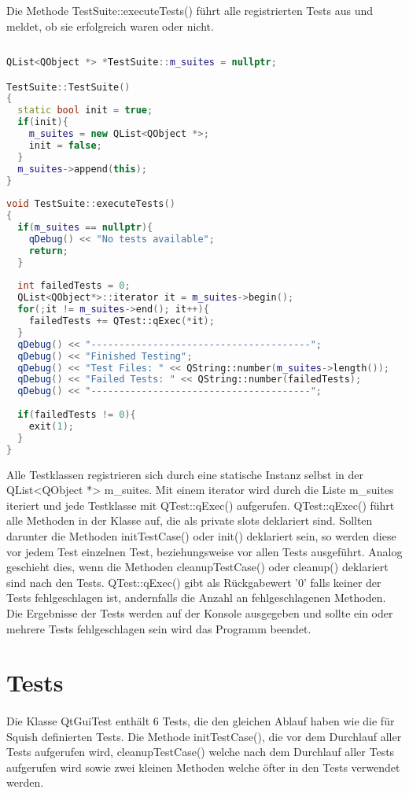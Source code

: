 		Die Methode TestSuite::executeTests() führt alle registrierten Tests aus und meldet, ob sie erfolgreich waren oder nicht.
		\begin{lstlisting}[language=C++, caption=testsuite.cpp]
			
QList<QObject *> *TestSuite::m_suites = nullptr;

TestSuite::TestSuite()
{
  static bool init = true;
  if(init){
    m_suites = new QList<QObject *>;
    init = false;
  }
  m_suites->append(this);
}
		
void TestSuite::executeTests()
{
  if(m_suites == nullptr){
    qDebug() << "No tests available";
    return;
  }
	
  int failedTests = 0;
  QList<QObject*>::iterator it = m_suites->begin();
  for(;it != m_suites->end(); it++){
  	failedTests += QTest::qExec(*it);
  }
  qDebug() << "---------------------------------------";
  qDebug() << "Finished Testing";
  qDebug() << "Test Files: " << QString::number(m_suites->length());
  qDebug() << "Failed Tests: " << QString::number(failedTests);
  qDebug() << "---------------------------------------";
	
  if(failedTests != 0){
    exit(1);
  }
}
\end{lstlisting}
		Alle Testklassen registrieren sich durch eine statische Instanz selbst in der QList<QObject *> m\_suites. Mit einem iterator wird durch die Liste m\_suites iteriert und jede Testklasse mit QTest::qExec() aufgerufen. QTest::qExec() führt alle Methoden in der Klasse auf, die als private slots deklariert sind. Sollten darunter die Methoden initTestCase() oder init() deklariert sein, so werden diese vor jedem Test einzelnen Test, beziehungsweise vor allen Tests ausgeführt. Analog geschieht dies, wenn die Methoden cleanupTestCase() oder cleanup() deklariert sind nach den Tests. QTest::qExec() gibt als Rückgabewert '0' falls keiner der Tests fehlgeschlagen ist, andernfalls die Anzahl an fehlgeschlagenen Methoden. Die Ergebnisse der Tests werden auf der Konsole ausgegeben und sollte ein oder mehrere Tests fehlgeschlagen sein wird das Programm beendet.
		
		\newpage
		
		\section{Tests}
		\paragraph{} Die Klasse QtGuiTest enthält 6 Tests, die den gleichen Ablauf haben wie die für Squish definierten Tests. Die Methode initTestCase(), die vor dem Durchlauf aller Tests aufgerufen wird, cleanupTestCase() welche nach dem Durchlauf aller Tests aufgerufen wird sowie zwei kleinen Methoden welche öfter in den Tests verwendet werden.
		
